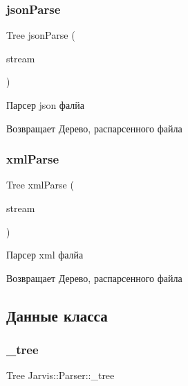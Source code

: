 \subsubsection{\texorpdfstring{json\+Parse}{jsonParse}}
{\footnotesize\ttfamily Tree json\+Parse (\begin{DoxyParamCaption}\item[{Parser\+::string\+Target \&}]{stream }\end{DoxyParamCaption})\hspace{0.3cm}{\ttfamily [friend]}}



Парсер json фалйа 

\begin{DoxyReturn}{Возвращает}
Дерево, распарсенного файла 
\end{DoxyReturn}
\mbox{\label{classJarvis_1_1Parser_a6f226036ccce1dd03cab22a3214374f4}} 
\subsubsection{\texorpdfstring{xml\+Parse}{xmlParse}}
{\footnotesize\ttfamily Tree xml\+Parse (\begin{DoxyParamCaption}\item[{Parser\+::string\+Target \&}]{stream }\end{DoxyParamCaption})\hspace{0.3cm}{\ttfamily [friend]}}



Парсер xml фалйа 

\begin{DoxyReturn}{Возвращает}
Дерево, распарсенного файла 
\end{DoxyReturn}


\subsection{Данные класса}
\mbox{\label{classJarvis_1_1Parser_aaa45f2682e516630116ab3a80028d0d4}} 
\subsubsection{\texorpdfstring{\+\_\+tree}{\_tree}}
{\footnotesize\ttfamily Tree Jarvis\+::\+Parser\+::\+\_\+tree}

